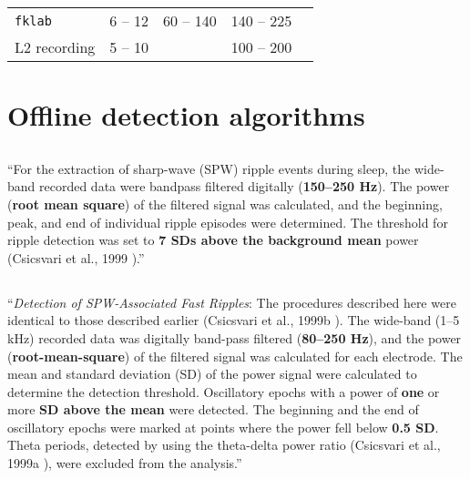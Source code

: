 \begin{table}
\begin{tabular}{@{}lllll@{}}
\midrule
\texttt{fklab}             & 6 -- 12    & 60 -- 140       & 140 -- 225  \\
L2 recording               & 5 -- 10    &                 & 100 -- 200  \\
\bottomrule
\end{tabular}
\label{tab:bands}
\end{table}





\clearpage
\section{Offline detection algorithms}
\label{apx:SWR-detection-literature}



\subsection{}

``For the extraction of sharp-wave (SPW) ripple events during sleep, the wide-band recorded data were bandpass filtered digitally (\textbf{150–250 Hz}). The power (\textbf{root mean square}) of the filtered signal was calculated, and the beginning, peak, and end of individual ripple episodes were determined. The threshold for ripple detection was set to \textbf{7 SDs above the background mean} power (Csicsvari et al., 1999 \cite{Csicsvari1999}).'' \cite{Nadasdy1999}


\subsection{}

``\emph{Detection of SPW-Associated Fast Ripples}: The procedures described here were identical to those described earlier (Csicsvari et al., 1999b \cite{Csicsvari1999a}). The wide-band (1–5 kHz) recorded data was digitally band-pass filtered (\textbf{80–250 Hz}), and the power (\textbf{root-mean-square}) of the filtered signal was calculated for each electrode. The mean and standard deviation (SD) of the power signal were calculated to determine the detection threshold. Oscillatory epochs with a power of \textbf{one} or more \textbf{SD above the mean} were detected. The beginning and the end of oscillatory epochs were marked at points where the power fell below \textbf{0.5 SD}. Theta periods, detected by using the theta-delta power ratio (Csicsvari et al., 1999a \cite{Csicsvari1999}), were excluded from the analysis.'' \cite{Csicsvari2000}


